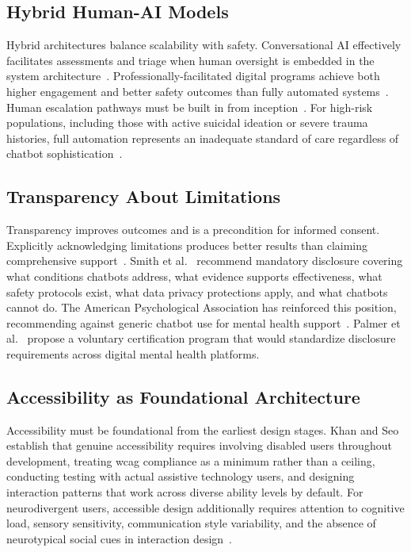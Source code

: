 \subsection{Hybrid Human-AI Models}

Hybrid architectures balance scalability with safety. Conversational AI effectively facilitates assessments and triage when human oversight is embedded in the system architecture~\cite{rollwage_2024}. Professionally-facilitated digital programs achieve both higher engagement and better safety outcomes than fully automated systems~\cite{liu_2023}. Human escalation pathways must be built in from inception~\cite{smith_2023}. For high-risk populations, including those with active suicidal ideation or severe trauma histories, full automation represents an inadequate standard of care regardless of chatbot sophistication~\cite{de_freitas_2024,palmer_2025}.

\subsection{Transparency About Limitations}

Transparency improves outcomes and is a precondition for informed consent. Explicitly acknowledging limitations produces better results than claiming comprehensive support~\cite{drydakis_2022}. Smith et al.~\cite{smith_2023} recommend mandatory disclosure covering what conditions chatbots address, what evidence supports effectiveness, what safety protocols exist, what data privacy protections apply, and what chatbots cannot do. The American Psychological Association has reinforced this position, recommending against generic chatbot use for mental health support~\cite{apa_2025}. Palmer et al.~\cite{palmer_2025} propose a voluntary certification program that would standardize disclosure requirements across digital mental health platforms.

\subsection{Accessibility as Foundational Architecture}

Accessibility must be foundational from the earliest design stages. Khan and Seo~\cite{khan_seo_2025} establish that genuine accessibility requires involving disabled users throughout development, treating \gls{wcag} compliance as a minimum rather than a ceiling, conducting testing with actual assistive technology users, and designing interaction patterns that work across diverse ability levels by default. For neurodivergent users, accessible design additionally requires attention to cognitive load, sensory sensitivity, communication style variability, and the absence of neurotypical social cues in interaction design~\cite{papadopoulos_2025,killian_2023}.


